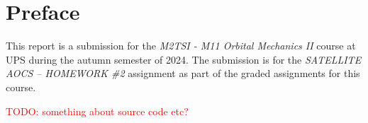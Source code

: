 \section*{Preface}

This report is a submission for the \textit{M2TSI - M11 Orbital Mechanics II} course at UPS during the autumn semester of 2024.
The submission is for the \textit{SATELLITE AOCS – HOMEWORK \#2} assignment as part of the graded assignments for this course.

\textcolor{red}{TODO: something about source code etc?}



